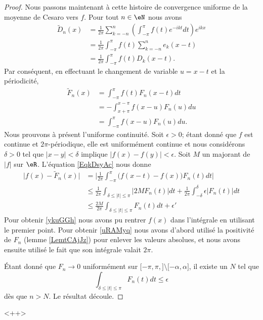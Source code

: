 \begin{proof}
    Nous passons maintenant à cette histoire de convergence uniforme de la moyenne de Cesaro vers \( f\). Pour tout \( n\in \eN\) nous avons
    \begin{subequations}
        \begin{align}
            \tilde  D_n(x)&=\frac{1}{ 2\pi }\sum_{k=-n}^n\left( \int_{-\pi}^{\pi}f(t) e^{-ikt}dt \right) e^{ikx}\\
            &=\frac{1}{ 2\pi }\int_{-\pi}^{\pi}f(t)\sum_{k=-n}^ne_k(x-t)\\
            &=\frac{1}{ 2\pi }\int_{-\pi}^{\pi}f(t)D_k(x-t).
        \end{align}
    \end{subequations}
    Par conséquent, en effectuant le changement de variable \( u=x-t\) et la périodicité,
    \begin{subequations}    \label{EqkDsyAc}
        \begin{align}
            \tilde F_n(x)&=\int_{-\pi}^{\pi}f(t)F_n(x-t)dt\\
            &=-\int_{x+\pi}^{x-\pi}f(x-u)F_n(u)du\\
            &=\int_{-\pi}^{\pi}f(x-u) F_n(u)du.
        \end{align}
    \end{subequations}
    Nous prouvons à présent l'uniforme continuité. Soit \( \epsilon>0\); étant donné que \( f\) est continue et \( 2\pi\)-périodique, elle est uniformément continue et nous considérons \( \delta>0\) tel que \( | x-y |<\delta\) implique \( \big| f(x)-f(y) \big|<\epsilon\). Soit \( M\) un majorant de \( | f |\) sur \( \eR\). L'équation \eqref{EqkDsyAc} nous donne
    \begin{subequations}
        \begin{align}
            \big| f(x)-\tilde F_n(x) \big|&=\big| \frac{1}{ 2\pi }\int_{-\pi}^{\pi}\big( f(x-t)-f(x) \big)F_n(t)dt \big|    \label{ykuGGh}\\
            &\leq\frac{1}{ 2\pi }\int_{\delta\leq| t |\leq \pi}| 2MF_n(t) |dt+\frac{1}{ 2\pi }\int_{-\delta}^{\delta}\epsilon| F_n(t) |dt\\
            &\leq\frac{ 2M }{ 2\pi }\int_{\delta\leq | t |\leq\pi}F_n(t)dt+\epsilon'    \label{uRAMyq}
        \end{align}
    \end{subequations}
    Pour obtenir \eqref{ykuGGh} nous avons pu rentrer \( f(x)\) dans l'intégrale en utilisant le premier point. Pour obtenir \eqref{uRAMyq} nous avons d'abord utilisé la positivité de \( F_n\) (lemme \ref{LemtCAjJz}) pour enlever les valeurs absolues, et nous avons ensuite utilisé le fait que son intégrale valait \( 2\pi\).

    Étant donné que \( F_n\to 0\) uniformément sur \( \mathopen[ -\pi,\pi ,  \mathclose]\setminus\mathopen[ -\alpha , \alpha \mathclose]\), il existe un \( N\) tel que 
    \begin{equation}
        \int_{\delta\leq| t |\leq \pi}F_n(t)dt\leq \epsilon
    \end{equation}
    dès que \( n>N\). Le résultat découle.
\end{proof}
<++>

